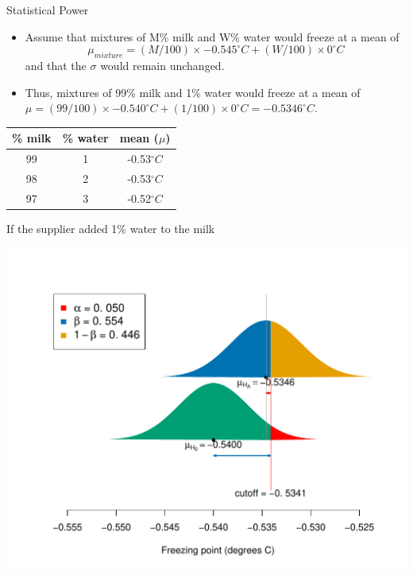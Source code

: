 \documentclass[10pt,handout]{beamer}\usepackage[]{graphicx}\usepackage[]{color}
\makeatletter
\def\maxwidth{ %
  \ifdim\Gin@nat@width>\linewidth
    \linewidth
  \else
    \Gin@nat@width
  \fi
}
\newenvironment{knitrout}{}{} %
\makeatother
\begin{document}
\begin{frame}{Statistical Power}
	\small
	\begin{itemize}
		\setlength\itemsep{1em}
		\item Assume that  mixtures of M\% milk and W\% water  would freeze at a mean of $$\mu_{mixture} =  (M/100) \times -0.545^{\circ}C + (W/100) \times 0 ^{\circ}C$$ and that the $\sigma$ would remain unchanged. \pause 
		\item Thus, mixtures of 99\% milk and 1\% water  would freeze at a mean of $\mu =  (99/100) \times -0.540^{\circ}C + (1/100) \times 0 ^{\circ}C = -0.5346 ^{\circ} C.$ 
	\end{itemize}
	
	\begin{center}
		\begin{tabular}{|c|c|c|}
			\hline 
			\% milk & \% water & mean ($\mu$) \\ 
			\hline 
			99 & 1 & -0.53$^{\circ}C$ \\ 
			98 & 2 & -0.53$^{\circ}C$ \\ 
			97 & 3 & -0.52$^{\circ}C$ \\ 
			\hline 
		\end{tabular} 
	\end{center}
\end{frame}


\begin{frame}[fragile]{If the supplier added 1\% water to the milk}
\begin{knitrout}\tiny
{}\color{fgcolor}

{\centering \includegraphics[width=\maxwidth]{figure/unnamed-chunk-7-1} 

}



\end{knitrout}
\end{frame}
\end{document}
